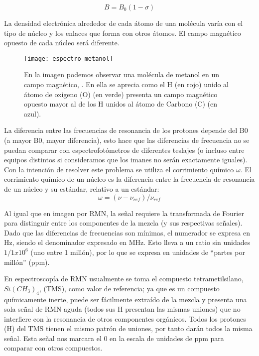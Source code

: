 \begin{equation}
 B = B_0 (1-\sigma)
\end{equation}

La densidad electrónica alrededor de cada átomo de una molécula varía con el tipo de núcleo y los enlaces que forma con otros átomos. El campo magnético opuesto de cada núcleo será diferente.



\begin{figure}[htb]
 \begin{figg}
   \texttt{[image: espectro\_metanol]}
   \caption{En la imagen podemos observar una molécula de metanol en un campo magnético, \Bzero. En ella se aprecia como el H (en rojo) unido al átomo de oxigeno (O) (en verde) presenta un campo magnético opuesto mayor al de los H unidos al átomo de Carbono (C) (en azul).}
 \label{fig:espectro_metanol}
 \end{figg}
\end{figure}




La diferencia entre las frecuencias de resonancia de los protones depende del B0 (a mayor B0, mayor diferencia), esto hace que las diferencias de frecuencia no se puedan comparar con espectrofotómetros de diferentes teslajes (o incluso entre equipos distintos si consideramos que los imanes no serán exactamente iguales). 
Con la intención de resolver este problema se utiliza el corrimiento químico $\omega$. El corrimiento químico de un núcleo es la diferencia entre la frecuencia de resonancia de un núcleo y su estándar, relativo a un estándar:
\begin{equation}
 \omega = (\nu - \nu_{ref}) / \nu_{ref}
\end{equation}

Al igual que en imagen por RMN, la señal requiere la transformada de Fourier para distinguir entre los componentes de la mezcla (y sus respectivas señales). Dado que las diferencias de frecuencias son mínimas, el numerador se expresa en Hz, siendo el denominador expresado en MHz. Esto lleva a un ratio sin unidades $1/1x10^6$ (uno entre 1 millón), por lo que se expresa en unidades de ``partes por millón'' (ppm).

En espectroscopía de RMN usualmente se toma el compuesto tetrametilsilano, $Si(CH_3)_4$, (TMS), como valor de referencia; ya que es un compuesto químicamente inerte, puede ser fácilmente extraído de la mezcla y presenta una sola señal de RMN aguda (todos sus H presentan las mismas uniones) que  no interfiere con la resonancia de otros componentes orgánicos. Todos los protones (H) del TMS tienen el mismo patrón de uniones, por tanto darán todos la misma señal. Esta señal nos marcara el 0 en la escala de unidades de ppm para comparar con otros compuestos. 



